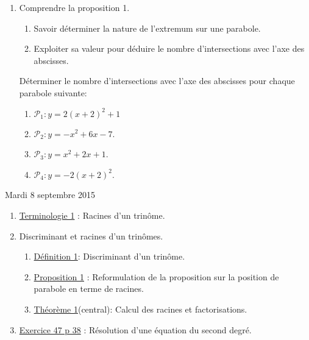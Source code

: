 \documentclass[a4paper,11pt]{article}
\theoremstyle{break}
\begin{document}
  \begin{Dev*}
    
    \begin{enumerate}
      
      \item Comprendre la proposition 1.
      \begin{enumerate}
	\item Savoir déterminer la nature de l'extremum sur une parabole.
	\item Exploiter sa valeur pour déduire le nombre d'intersections 
	avec l'axe des abscisses.
	
      \end{enumerate}
      
      \vspace{0.5cm}
      
      \begin{dm}
	
	Déterminer le nombre d'intersections avec l'axe des abscisses pour chaque parabole
	suivante:
	\begin{enumerate}
	  \item $\mathcal{P}_1:y=2(x+2)^2+1$
	  \item $\mathcal{P}_2:y=-x^2+6x-7$.%
	  \item $\mathcal{P}_3:y=x^2+2x+1$.
	  \item $\mathcal{P}_4:y=-2(x+2)^2$.
	\end{enumerate} 
      \end{dm}
      
      
      
    \end{enumerate}
  \end{Dev*}
  
  
  Mardi 8 septembre 2015
   \begin{enumerate}   
    \item 
    \href{https://github.com/mathlorgues/math1sd1516/blob/master/20150908/definitions.pdf}
    {Terminologie 1} : Racines d'un trinôme.    
    \item Discriminant et racines d'un trinômes.
    \begin{enumerate}
      \item 
      \href{https://github.com/mathlorgues/math1sd1516/blob/master/20150908/definitions.pdf}
      {Définition 1}: Discriminant d'un trinôme.
      \item 
    \href{https://github.com/mathlorgues/math1sd1516/blob/master/20150908/propositions.pdf}
    {Proposition 1} : Reformulation de la proposition sur la position de parabole 
    en terme de racines.
      \item 
      \href{https://github.com/mathlorgues/math1sd1516/blob/master/20150908/propositions.pdf}
      {Théorème 1}(central): Calcul des racines et factorisations.
    \end{enumerate}
    \item 
    \href{https://github.com/mathlorgues/math1sd1516/blob/master/images/47-52p38.png}
    {Exercice 47 p 38} : Résolution d'une équation du second degré.
    
    
    
  \end{enumerate}
  
\end{document}
